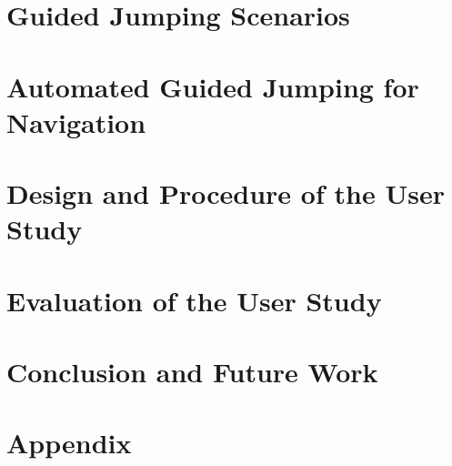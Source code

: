 
\chapter{Guided Jumping Scenarios}



\chapter{Automated Guided Jumping for Navigation}



%


\chapter{Design and Procedure of the User Study}



%


\chapter{Evaluation of the User Study}



\chapter{Conclusion and Future Work}



{\footnotesize
{}

}


\appendix
\chapter{Appendix}




